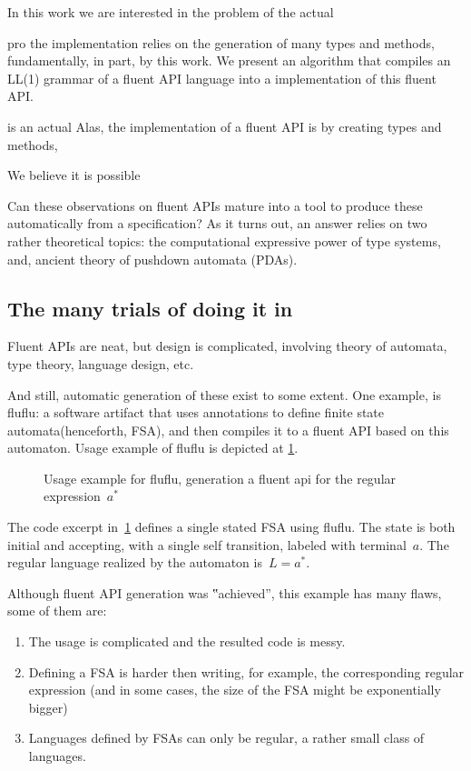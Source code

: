 In this work we are interested in the problem of the actual 


pro
the implementation relies on the generation of many types and methods, fundamentally,  
in part, by this 
  work.
We present an algorithm that compiles an LL(1) grammar of a fluent API language
  into a \Java implementation of this fluent API.

\Fajita is an actual  
Alas, the implementation of a fluent API is by creating
  types and methods, 

We believe it is possible

Can these observations on fluent APIs mature into
  a tool to produce these automatically from a specification?
As it turns out, an answer relies on
  two rather theoretical topics:
  the computational expressive power of type systems,
  and, ancient theory of pushdown automata (PDAs).

\subsection{The many trials of doing it in \Java}
Fluent APIs are neat, but design is complicated,
involving theory of automata, type theory, language design, etc.

And still, automatic generation of these exist to some extent.
One example, is fluflu: a software artifact that uses
\Java annotations to define finite state automata(henceforth, FSA), and then
compiles it to a fluent API based on this automaton. Usage example of fluflu is
depicted at \cref{figure:fluflu}.

\begin{figure}[ht]
  \caption{\label{figure:fluflu}
    Usage example for fluflu, generation a fluent
    api for the regular expression~$a^*$}
\end{figure}
The code excerpt in~\cref{figure:fluflu} defines a single stated FSA using
fluflu. The state is both initial and accepting, with a single self
transition, labeled with terminal~$a$. The regular language realized by the
automaton is~$L=a^*$.

Although fluent API generation was ‟achieved”, this example has many flaws, some of them are:

\begin{enumerate}
  \item The usage is complicated and the resulted code is messy.
  \item Defining a FSA is harder then writing, for example, the corresponding regular
    expression (and in some cases, the size of the FSA might be exponentially bigger)
  \item Languages defined by FSAs can only be regular, a rather small
    class of languages.
\end{enumerate}

